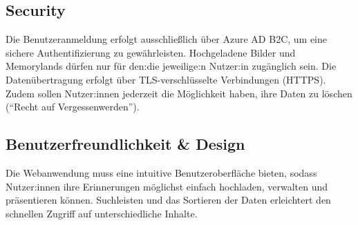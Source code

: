 \subsection{Security}

Die Benutzeranmeldung erfolgt ausschlie\ss{}lich über Azure AD B2C, um eine sichere 
Authentifizierung zu gewährleisten. Hochgeladene Bilder und Memorylands dürfen nur 
für den:die jeweilige:n Nutzer:in zugänglich sein. Die Datenübertragung 
erfolgt über TLS-verschlüsselte Verbindungen (HTTPS). Zudem sollen Nutzer:innen jederzeit 
die Möglichkeit haben, ihre Daten zu löschen (``Recht auf Vergessenwerden'').

\subsection{Benutzerfreundlichkeit \& Design}

Die Webanwendung muss eine intuitive Benutzeroberfläche bieten, sodass Nutzer:innen ihre 
Erinnerungen möglichst einfach hochladen, verwalten und präsentieren können. 
Suchleisten und das Sortieren der Daten erleichtert den schnellen Zugriff auf 
unterschiedliche Inhalte.
